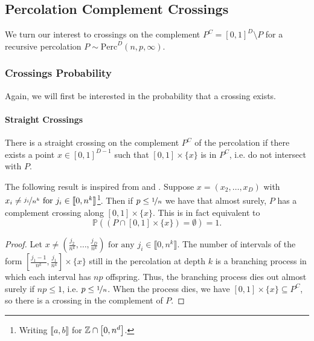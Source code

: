 
\subsection{Percolation Complement Crossings}
We turn our interest to crossings on the complement $P^C = \left[ 0,1 \right]^D \setminus P$ for a recursive percolation $P \sim \text{Perc}^D(n,p,\infty)$.

\subsubsection{Crossings Probability}
Again, we will first be interested in the probability that a crossing exists.

\paragraph{Straight Crossings}
There is a straight crossing on the complement $P^C$ of the percolation if there exists a point $x \in \left[ 0,1 \right]^{D-1}$ such that $\left[ 0,1 \right] \times \{ x \}$  is in $P^C$, i.e. do not intersect with $P$.

The following result is inspired from \cite[p.309 b.(1)]{Chayes_1988} and \cite[p.215]{Mandelbrot_1982}.
Suppose $x = (x_2,\dots,x_D)$ with $x_i \neq \nicefrac{j_i}{n^k} \text{ for } j_i \in \llbracket 0,n^k \rrbracket$\footnote{Writing $\llbracket a,b \rrbracket$ for $\mathbb{Z} \cap \left[ 0,n^d \right]$.}.
Then if $p \leq \nicefrac{1}{n}$ we have that almost surely, $P$ has a complement crossing along $\left[ 0,1 \right] \times \{ x \}$.
This is in fact equivalent to 
$$\mathbb{P}\left( \left( P \cap \left[ 0,1 \right] \times \{ x \} \right) = \emptyset \right) = 1 .$$
\begin{proof}
	Let $x \neq \left( \frac{j_2}{n^k},\dots,\frac{j_D}{n^k} \right) \text{ for any } j_i \in \llbracket 0,n^k \rrbracket$.
	The number of intervals of the form $\left[ \frac{j_1-1}{n^k},\frac{j_1}{n^k} \right] \times \{ x \}$ still in the percolation at depth $k$ is a branching process in which each interval has $np$ offspring.
	Thus, the branching process dies out almost surely if $np \leq 1$, i.e. $p \leq \nicefrac{1}{n}$.
	When the process dies, we have $\left[ 0,1 \right] \times \{ x \} \subseteq P^C$, so there is a crossing in the complement of $P$.
\end{proof}

